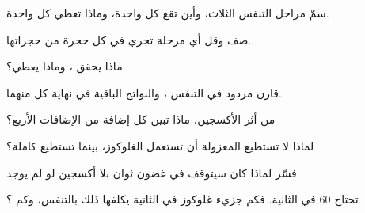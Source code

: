 \begin{exercise}[$\star$]\label{exo:g12:respiration-fermentation:2}
سمّ مراحل التنفس الثلاث، وأين تقع كل واحدة، وماذا تعطي كل واحدة.
\end{exercise}

\begin{exercise}[$\star$]\label{exo:g12:respiration-fermentation:3}
صف  وقل أي مرحلة تجري في كل حجرة من حجراتها.
\end{exercise}

\begin{exercise}[$\star$]\label{exo:g12:respiration-fermentation:4}
ماذا يحقق  ، وماذا يعطي؟
\end{exercise}

\begin{exercise}[$\star$]\label{exo:g12:respiration-fermentation:5}
قارن مردود  في التنفس ، والنواتج الباقية في نهاية كل منهما.
\end{exercise}

\begin{exercise}[$\star\star$]\label{exo:g12:respiration-fermentation:6}
من أثر الأكسجين، ماذا تبين كل إضافة من الإضافات الأربع؟
\end{exercise}

\begin{exercise}[$\star\star$]\label{exo:g12:respiration-fermentation:7}
لماذا لا تستطيع  المعزولة أن تستعمل الغلوكوز، بينما تستطيع
 كاملة؟
\end{exercise}

\begin{exercise}[$\star\star$]\label{exo:g12:respiration-fermentation:8}
فسّر لماذا كان  سيتوقف في غضون ثوان بلا أكسجين لو لم يوجد
.
\end{exercise}

\begin{exercise}[$\star\star$]\label{exo:g12:respiration-fermentation:9}
 تحتاج 60  في الثانية. فكم جزيء غلوكوز في الثانية يكلفها ذلك
بالتنفس، وكم ؟
\end{exercise}


